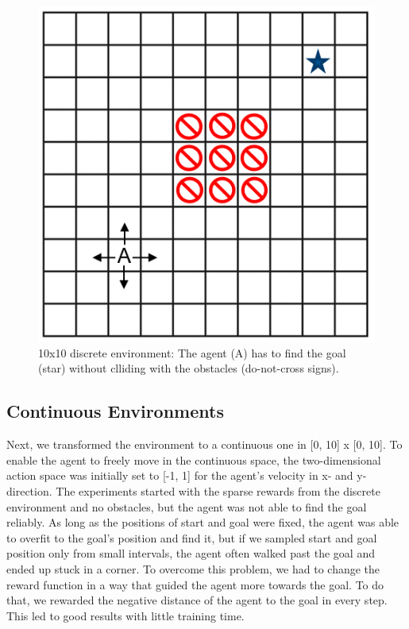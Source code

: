 \documentclass[conference]{IEEEtran}
\begin{document}
\begin{figure}[htbp]
\centerline{\includegraphics{discrete.png}}
\caption{10x10 discrete environment: The agent (A) has to find the goal (star) without clliding with the obstacles (do-not-cross signs).}
\label{fig1}
\end{figure}

\subsection{Continuous Environments}

Next, we transformed the environment to a continuous one in [0, 10] x [0, 10]. To enable the agent to freely move in the continuous space, the two-dimensional action space was initially set to [-1, 1] for the agent's velocity in x- and y-direction. The experiments started with the sparse rewards from the discrete environment and no obstacles, but the agent was not able to find the goal reliably. As long as the positions of start and goal were fixed, the agent was able to overfit to the goal's position and find it, but if we sampled start and goal position only from small intervals, the agent often walked past the goal and ended up stuck in a corner. To overcome this problem, we had to change the reward function in a way that guided the agent more towards the goal. To do that, we rewarded the negative distance of the agent to the goal in every step. This led to good results with little training time.
\end{document}
